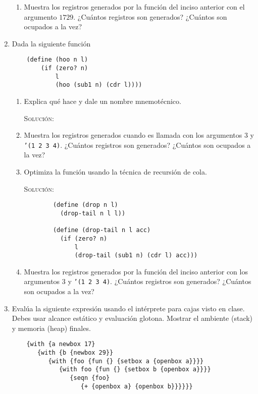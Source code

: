 \documentclass[letterpaper,11pt]{article}
\begin{document}
\begin{enumerate}
\begin{enumerate}
        \item Muestra los registros generados por la función del inciso anterior 
        con el argumento $1729$. ¿Cuántos registros son generados? ¿Cuántos son 
        ocupados a la vez?
    \end{enumerate}

    \item Dada la siguiente función 
    \begin{verbatim}
    (define (hoo n l)
        (if (zero? n)
            l
            (hoo (sub1 n) (cdr l))))
    \end{verbatim}

    \begin{enumerate}
        \item Explica qué hace y dale un nombre mnemotécnico.
        
        \textsc{Solución:}

        \item Muestra los registros generados cuando es llamada con los 
        argumentos $3$ y \texttt{'(1 2 3 4)}. ¿Cuántos registros son generados?
        ¿Cuántos son ocupados a la vez?

        \item Optimiza la función usando la técnica de recursión de cola.
        
        \textsc{Solución:}
        \begin{verbatim}
        (define (drop n l)
          (drop-tail n l l))
          
        (define (drop-tail n l acc)
          (if (zero? n)
              l
              (drop-tail (sub1 n) (cdr l) acc)))
        \end{verbatim}

        \item Muestra los registros generados por la función del inciso anterior
        con los argumentos $3$ y \texttt{'(1 2 3 4)}. ¿Cuántos registros son 
        generados? ¿Cuántos son ocupados a la vez?
    \end{enumerate}

    \newpage
    \item Evalúa la siguiente expresión usando el intérprete para cajas visto 
    en clase. Debes usar alcance estático y evaluación glotona. Mostrar el 
    ambiente (stack) y memoria (heap) finales.
    \begin{verbatim}
    {with {a newbox 17}
       {with {b {newbox 29}}
          {with {foo {fun {} {setbox a {openbox a}}}}
             {with foo {fun {} {setbox b {openbox a}}}}
                {seqn {foo}
                   {+ {openbox a} {openbox b}}}}}}
    \end{verbatim}


\end{enumerate}
\end{document}
